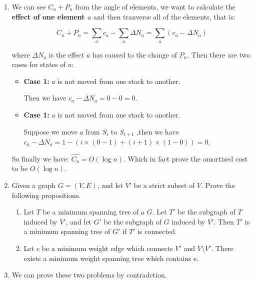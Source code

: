 \documentclass[12pt,a4paper]{article}
\makeatletter
\newtheorem*{solution}{Solution}
\theoremstyle{definition}
\renewenvironment{solution}[1][Solution] {\par\pushQED{\qed}\normalfont\topsep6\p@\@plus6\p@\relax\trivlist\item[\hskip\labelsep\bfseries#1\@addpunct{.}]\ignorespaces}{\popQED\endtrivlist\@endpefalse} \makeatother
\makeatother
\begin{document}
\begin{enumerate}
\begin{solution}
	   We can see $C_n + P_n$ from the angle of elements, we want to calculate the \textbf{effect of one element $a$} and then tranverse all of the elements, that is:
	  
	   \begin{equation*}
		C_n + P_n = \sum_{a}c_a - \sum_{a}\Delta{N_a} = \sum_{a}(c_a - \Delta{N_a})
	   \end{equation*}

	   where $\Delta{N_a}$ is the effect $a$ has caused to the change of $P_n$. Then there are two cases for states of $a$:

	   \begin{itemize}
		   \item \textbf{Case 1:} $a$ is not moved from one stack to another.
		   
		   Then we have $c_a - \Delta{N_a} = 0 - 0 =0$.

		   \item \textbf{Case 1:} $a$ is not moved from one stack to another.
		   
		   Suppose we move $a$ from $S_i$ to $S_{i+1}$
		   ,then we have $c_a - \Delta{N_a} = 1 - (i\times(0-1) + (i+1)\times(1-0)) = 0$. 
		\end{itemize}

		So finally we have: $\hat{C_n} = O(\log n)$. Which in fact prove the amortized cost to be $O(\log n)$.

	

   



\end{solution}

	\item Given a graph $G = (V, E)$, and let $V'$ be a strict subset of $V$. Prove the following propositions.
	
	\begin{enumerate}
		\item Let $T$ be a minimum spanning tree of a $G$. Let $T'$ be the subgraph of $T$ induced by $V'$, and let $G'$ be the subgraph of $G$ induced by $V'$. Then $T'$ is a minimum spanning tree of $G'$ if $T'$ is connected.
		\item Let $e$ be a minimum weight edge which connects $V'$ and $V \setminus V'$. There exists a minimum weight spanning tree which contains e.
	\end{enumerate}



\begin{solution}
	We can prove these two problems by contradction.


\end{solution}
\end{enumerate}
\end{document}
